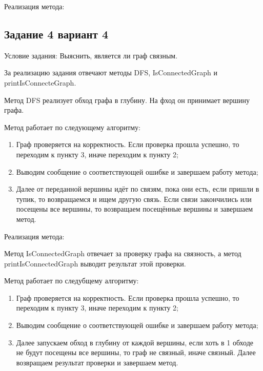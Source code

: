 \documentclass[bachelor, och, pract]{SCWorks}
\begin{document}
Реализация метода:
\bigskip


\bigskip

\subsection{Задание 4 вариант 4}

Условие задания: Выяснить, является ли граф связным.
\bigskip

За реализацию задания отвечают методы DFS, IsConnectedGraph
и printIsConnecteGraph.
\bigskip

Метод DFS реализует обход графа в глубину. На фход он принимает вершину графа.
\smallskip

Метод работает по следующему алгоритму:

\begin{enumerate}
  \item {Граф проверяется на корректность. Если проверка прошла успешно,
  то переходим к пункту 3, иначе переходим к пункту 2;}
  \item {Выводим сообщение о соответствующей ошибке и завершаем работу метода;}
  \item {Далее от переданной вершины идёт по связям, пока они есть, если пришли в тупик,
  то возвращаемся и ищем другую связь. Если связи закончились или посещены все вершины,
  то возвращаем посещённые вершины и завершаем метод.}
\end{enumerate}

Реализация метода:
\smallskip


\bigskip

Метод IsConnectedGraph отвечает за проверку графа на связность,
а метод printIsConnectedGraph выводит результат этой проверки.
\smallskip

Метод работает по следубщему алгоритму:

\begin{enumerate}
  \item {Граф проверяется на корректность. Если проверка прошла успешно,
  то переходим к пункту 3, иначе переходим к пункту 2;}
  \item {Выводим сообщение о соответствующей ошибке и завершаем работу метода;}
  \item {Далее запускаем обход в глубину от каждой вершины, если хоть в 1 обходе
  не будут посещены все вершины, то граф не связный, иначе связный.
  Далее возвращаем результат проверки и завершаем метод.}


\end{enumerate}
\end{document}
